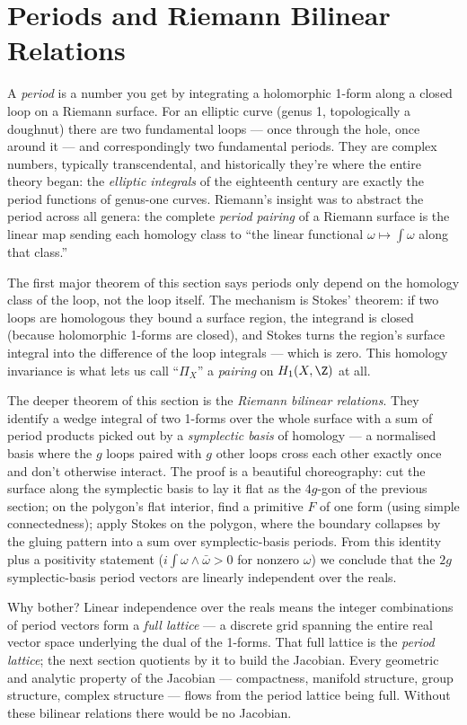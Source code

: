 \section{Periods and Riemann Bilinear Relations}
\label{sec:periods}

\begin{layman}
A \emph{period} is a number you get by integrating a holomorphic
1-form along a closed loop on a Riemann surface. For an elliptic
curve (genus 1, topologically a doughnut) there are two
fundamental loops — once through the hole, once around it — and
correspondingly two fundamental periods. They are complex numbers,
typically transcendental, and historically they're where the entire
theory began: the \emph{elliptic integrals} of the eighteenth
century are exactly the period functions of genus-one curves.
Riemann's insight was to abstract the period across all genera:
the complete \emph{period pairing} of a Riemann surface is the
linear map sending each homology class to ``the linear functional
\(\omega \mapsto \int \omega\) along that class.''

The first major theorem of this section says periods only depend on
the homology class of the loop, not the loop itself. The mechanism
is Stokes' theorem: if two loops are homologous they bound a
surface region, the integrand is closed (because holomorphic
1-forms are closed), and Stokes turns the region's surface integral
into the difference of the loop integrals — which is zero. This
homology invariance is what lets us call ``\(\Pi_X\)'' a
\emph{pairing} on \(H_1(X,\Z)\) at all.

The deeper theorem of this section is the \emph{Riemann bilinear
relations}. They identify a wedge integral of two 1-forms over the
whole surface with a sum of period products picked out by a
\emph{symplectic basis} of homology — a normalised basis where the
\(g\) loops paired with \(g\) other loops cross each other exactly
once and don't otherwise interact. The proof is a beautiful
choreography: cut the surface along the symplectic basis to lay it
flat as the \(4g\)-gon of the previous section; on the polygon's
flat interior, find a primitive \(F\) of one form (using simple
connectedness); apply Stokes on the polygon, where the boundary
collapses by the gluing pattern into a sum over symplectic-basis
periods. From this identity plus a positivity statement
(\(i\int \omega \wedge \bar\omega > 0\) for nonzero \(\omega\)) we
conclude that the \(2g\) symplectic-basis period vectors are
linearly independent over the reals.

Why bother? Linear independence over the reals means the integer
combinations of period vectors form a \emph{full lattice} — a
discrete grid spanning the entire real vector space underlying the
dual of the 1-forms. That full lattice is the \emph{period lattice};
the next section quotients by it to build the Jacobian. Every
geometric and analytic property of the Jacobian — compactness,
manifold structure, group structure, complex structure — flows
from the period lattice being full. Without these bilinear
relations there would be no Jacobian.
\end{layman}

